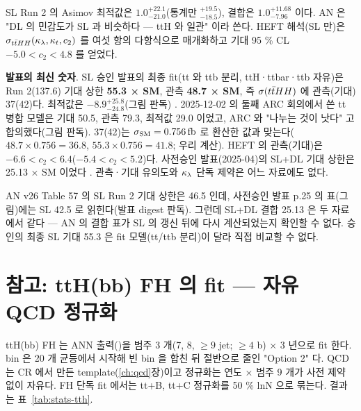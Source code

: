 SL Run 2 의 Asimov 최적값은 $1.0^{+22.1}_{-21.0}$(통계만 $^{+19.5}_{-18.5}$), 결합은 $1.0^{+11.68}_{-7.96}$ 이다. AN 은 "DL 의 민감도가
SL 과 비슷하다 — ttH 와 일관" 이라 쓴다. HEFT 해석(SL 만)은 $\sigma_{t\bar{t}HH}(\kappa_{\lambda},\kappa_{t},c_2)$ 를 여섯 항의 다항식으로 매개화하고
기대 95 \% CL $-5.0<c_2<4.8$ 를 얻었다.

\textbf{발표의 최신 숫자}. SL 승인 발표의 최종 fit(tt 와 ttb 분리, ttH·ttbar·ttb 자유)은 Run 2(137.6\fbinv) 기대 상한 \textbf{55.3 × SM}, 관측
\textbf{48.7 × SM}, 즉 $\sigma(t\bar{t}HH)$ 에 관측(기대) 37(42)\fb 다. 최적값은 $-8.9^{+25.8}_{-24.8}$(그림 판독)
. 2025-12-02 의 둘째 ARC 회의에서 쓴 tt 병합 모델은 기대 50.5, 관측 79.3, 최적값 29.0 이었고, ARC 와 "나누는 것이 낫다" 고
합의했다(그림 판독). 37(42)\fb 는 $\sigma_{\mathrm{SM}}=0.756\,\mathrm{fb}$ 로 환산한 값과 맞는다($48.7\times0.756=36.8$, $55.3\times0.756=41.8$;
우리 계산). HEFT 의 관측(기대)은 $-6.6<c_2<6.4$($-5.4<c_2<5.2$)다. 사전승인 발표(2025-04)의 SL+DL 기대 상한은 25.13 × SM 이었다
. 관측·기대 유의도와 $\kappa_{\lambda}$ 단독 제약은 어느 자료에도 없다.

\begin{openq}[숫자가 서로 다른 곳]
AN v26 Table 57 의 SL Run 2 기대 상한은 46.5 인데, 사전승인 발표 p.25 의 표(그림)에는 SL 42.5 로 읽힌다(발표 digest 판독). 그런데 SL+DL 결합 25.13 은 두 자료에서
같다 — AN 의 결합 표가 SL 의 갱신 뒤에 다시 계산되었는지 확인할 수 없다. 승인의 최종 SL 기대 55.3 은 fit 모델(tt/ttb 분리)이 달라 직접 비교할 수 없다.
\end{openq}

\section{참고: ttH(bb) FH 의 fit — 자유 QCD 정규화}\label{sec:stats-tth}

ttH(bb) FH 는 ANN 출력()을 범주 3 개(7, 8, $\ge9$ jet; $\ge4$ b) × 3 년으로 fit 한다. bin 은 20 개 균등에서 시작해 빈 bin 을 합친 뒤
절반으로 줄인 "Option 2" 다. QCD 는 CR 에서 만든 template(\ref{ch:qcd}장)이고 정규화는 연도 × 범주 9 개가 사전 제약
없이 자유다. FH 단독 fit 에서는 tt+B, tt+C 정규화를 50 \% lnN 으로 묶는다. 결과는 표~\ref{tab:stats-tth}.

